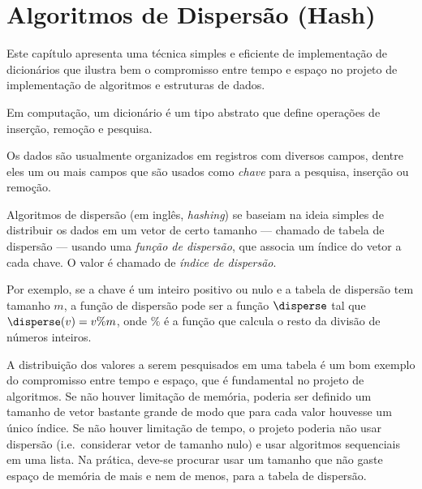 \chapter{Algoritmos de Dispersão (Hash)}
\label{dispersao}

Este capítulo apresenta uma técnica simples e eficiente de
implementação de dicionários que ilustra bem o compromisso entre tempo
e espaço no projeto de implementação de algoritmos e estruturas de
dados.

 Em computação, um dicionário é um tipo abstrato que
define operações de inserção, remoção e pesquisa.

Os dados são usualmente organizados em registros com diversos campos,
dentre eles um ou mais campos que são usados como {\em chave\/} para a
pesquisa, inserção ou remoção.

  Algoritmos de
dispersão (em inglês, {\em hashing\/}) se baseiam na ideia simples de
distribuir os dados em um vetor de certo tamanho --- chamado de tabela
de dispersão --- usando uma {\em função de dispersão\/}, que associa
um índice do vetor a cada chave. O valor é chamado de {\em índice de
  dispersão\/}.

Por exemplo, se a chave é um inteiro positivo ou nulo e a tabela de
dispersão tem tamanho $m$, a função de dispersão pode ser a função
$\disperse$ tal que $\disperse(v) = v \% m$, onde $\%$ é a função que
calcula o resto da divisão de números inteiros.


A distribuição dos valores a serem pesquisados em uma tabela é um bom
exemplo do compromisso entre tempo e espaço, que é fundamental no
projeto de algoritmos. Se não houver limitação de memória, poderia ser
definido um tamanho de vetor bastante grande de modo que para cada
valor houvesse um único índice. Se não houver limitação de tempo, o
projeto poderia não usar dispersão (i.e.~considerar vetor de tamanho
nulo) e usar algoritmos sequenciais em uma lista. Na prática, deve-se
procurar usar um tamanho que não gaste espaço de memória de mais e nem
de menos, para a tabela de dispersão.

